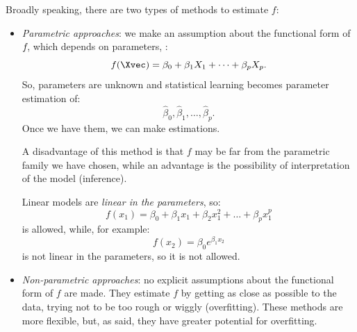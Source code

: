 \begin{description}
          Broadly speaking, there are two types of methods to estimate $f$:
          \begin{itemize}
              \item \emph{Parametric approaches}: we make an assumption about the functional form of $f\negthinspace$, which depends on parameters, \eg:
                    \begin{equation}
                        f(\Xvec) = \beta_0 + \beta_1 X_1 + \dots + \beta_p X_p.
                    \end{equation}
                    So, parameters are unknown and statistical learning becomes parameter estimation of:
                    \begin{equation}
                        \hat{\beta}_0, \hat{\beta}_1, \dots, \hat{\beta}_p.
                    \end{equation}
                    Once we have them, we can make estimations.

                    A disadvantage of this method is that $f$ may be far from the parametric family we have chosen, while an advantage is the possibility of interpretation of the model (inference).

                    \begin{note}
                        Linear models are \emph{linear in the parameters}, so:
                        \begin{equation}
                            f(x_1) = \beta_0 + \beta_1 x_1 + \beta_2 x_1^2 + \dots + \beta_p x_1^p
                        \end{equation}
                        is allowed, while, for example:
                        \begin{equation}
                            f(x_2) = \beta_0e^{\beta_1 x_2}
                        \end{equation}
                        is not linear in the parameters, so it is not allowed.
                    \end{note}
              \item \emph{Non-parametric approaches}: no explicit assumptions about the functional form of $f$ are made. They estimate $f$ by getting as close as possible to the data, trying not to be too rough or wiggly (overfitting). These methods are more flexible, but, as said, they have greater potential for overfitting.
          \end{itemize}
\end{description}

